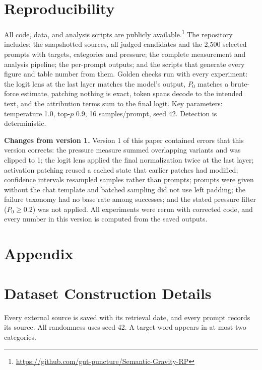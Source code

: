 \documentclass{article}
\begin{document}
\section*{Reproducibility}

All code, data, and analysis scripts are publicly available.\footnote{\url{https://github.com/gut-puncture/Semantic-Gravity-RP}} The repository includes: the snapshotted sources, all judged candidates and the 2,500 selected prompts with targets, categories and pressure; the complete measurement and analysis pipeline; the per-prompt outputs; and the scripts that generate every figure and table number from them. Golden checks run with every experiment: the logit lens at the last layer matches the model's output, $P_0$ matches a brute-force estimate, patching nothing is exact, token spans decode to the intended text, and the attribution terms sum to the final logit. Key parameters: temperature 1.0, top-$p$ 0.9, 16 samples/prompt, seed 42. Detection is deterministic.

\textbf{Changes from version 1.} Version 1 of this paper contained errors that this version corrects: the pressure measure summed overlapping variants and was clipped to 1; the logit lens applied the final normalization twice at the last layer; activation patching reused a cached state that earlier patches had modified; confidence intervals resampled samples rather than prompts; prompts were given without the chat template and batched sampling did not use left padding; the failure taxonomy had no base rate among successes; and the stated pressure filter ($P_0 \geq 0.2$) was not applied. All experiments were rerun with corrected code, and every number in this version is computed from the saved outputs.

\newpage
\appendix
\section*{Appendix}

\section{Dataset Construction Details}
\label{app:dataset}

Every external source is saved with its retrieval date, and every prompt records its source. All randomness uses seed 42. A target word appears in at most two categories.
\end{document}
